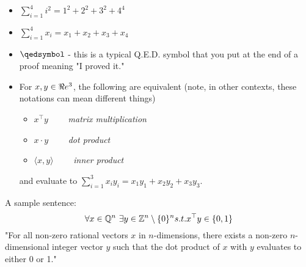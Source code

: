 \begin{itemize}
\item $\sum_{i=1}^4 i^2 = 1^2 + 2^2 + 3^2 + 4^4$
\item $\sum_{i=1}^4 x_i = x_1 + x_2 + x_3 + x_4$
\item $\qedsymbol$ - this is a typical Q.E.D. symbol that you put at the end of a proof meaning "I proved it."
\item For $x,y \in \Re e^3$, the following are equivalent (note, in other contexts, these notations can mean different things)
\begin{itemize}
\item $x^\top y$ \ \ \ \ \emph{matrix multiplication}
\item $x \cdot y$ \ \ \ \ \emph{dot product}
\item $\langle x,y\rangle$ \ \ \ \ \emph{inner product}
\end{itemize}
and evaluate to $\sum_{i=1}^3 x_i y_i = x_1 y_1 + x_2 y_2 + x_3 y_3$.
\end{itemize}


A sample sentence:
$$
\forall x \in \Q^n \ \exists y \in \Z^n\setminus \{0\}^n s.t.  x^\top y \in \{0,1\}
$$
"For all non-zero rational vectors $x$ in $n$-dimensions, there exists a non-zero $n$-dimensional integer vector $y$ such that the dot product of $x$ with $y$ evaluates to either 0 or 1."


%
